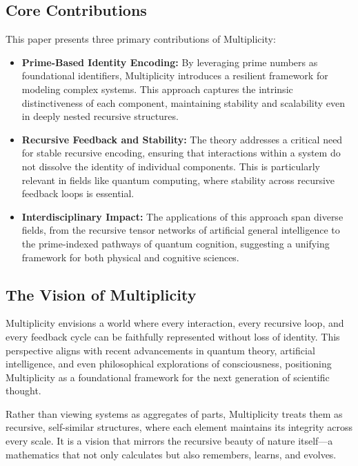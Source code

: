 \documentclass{article}
\theoremstyle{plain}
\begin{document}
\subsection{Core Contributions}

This paper presents three primary contributions of Multiplicity:

\begin{itemize}
    \item \textbf{Prime-Based Identity Encoding:} By leveraging prime numbers as foundational identifiers, Multiplicity introduces a resilient framework for modeling complex systems. This approach captures the intrinsic distinctiveness of each component, maintaining stability and scalability even in deeply nested recursive structures.
    
    \item \textbf{Recursive Feedback and Stability:} The theory addresses a critical need for stable recursive encoding, ensuring that interactions within a system do not dissolve the identity of individual components. This is particularly relevant in fields like quantum computing, where stability across recursive feedback loops is essential.
    
    \item \textbf{Interdisciplinary Impact:} The applications of this approach span diverse fields, from the recursive tensor networks of artificial general intelligence to the prime-indexed pathways of quantum cognition, suggesting a unifying framework for both physical and cognitive sciences.
\end{itemize}

\subsection{The Vision of Multiplicity}

Multiplicity envisions a world where every interaction, every recursive loop, and every feedback cycle can be faithfully represented without loss of identity. This perspective aligns with recent advancements in quantum theory, artificial intelligence, and even philosophical explorations of consciousness, positioning Multiplicity as a foundational framework for the next generation of scientific thought.

Rather than viewing systems as aggregates of parts, Multiplicity treats them as recursive, self-similar structures, where each element maintains its integrity across every scale. It is a vision that mirrors the recursive beauty of nature itself—a mathematics that not only calculates but also remembers, learns, and evolves.
\end{document}
